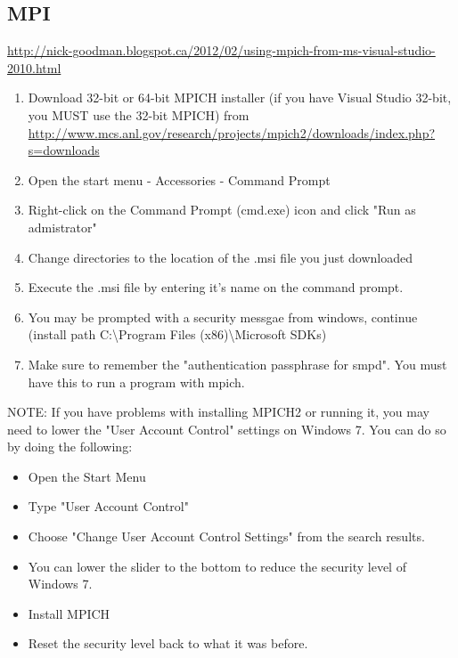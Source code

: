  \subsection{MPI}
 \url{http://nick-goodman.blogspot.ca/2012/02/using-mpich-from-ms-visual-studio-2010.html}
 \begin{enumerate}
\item Download 32-bit or 64-bit MPICH installer (if you have Visual Studio 32-bit, you MUST use the 32-bit MPICH) from \url{http://www.mcs.anl.gov/research/projects/mpich2/downloads/index.php?s=downloads}
\item  Open the start menu - Accessories - Command Prompt
\item Right-click on the Command Prompt (cmd.exe) icon and click "Run as admistrator"
\item Change directories to the location of the .msi file you just downloaded
\item Execute the .msi file by entering it's name on the command prompt.
\item You may be prompted with a security messgae from windows, continue (install path C:\textbackslash Program Files (x86)\textbackslash Microsoft SDKs)
\item Make sure to remember the "authentication passphrase for smpd".  You must have this to run a program with mpich.
\end{enumerate} 
 NOTE: If you have problems with installing MPICH2 or running it, you may need to lower the "User Account Control" settings on Windows 7.  You can do so by doing the following:
\begin{itemize}\item  Open the Start Menu
\item Type "User Account Control"
\item Choose "Change User Account Control Settings" from the search results.
\item You can lower the slider to the bottom to reduce the security level of Windows 7.
\item Install MPICH
\item Reset the security level back to what it was before. \end{itemize}

